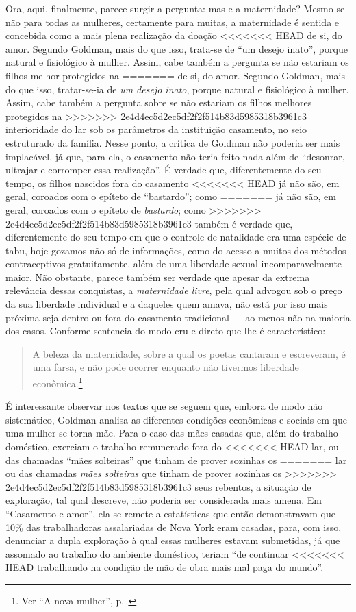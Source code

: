 Ora, aqui, finalmente, parece surgir a pergunta: mas e a maternidade?
Mesmo se não para todas as mulheres, certamente para muitas, a
maternidade é sentida e concebida como a mais plena realização da doação
<<<<<<< HEAD
de si, do amor. Segundo Goldman, mais do que isso, trata-se de ``um
desejo inato'', porque natural e fisiológico à mulher. Assim, cabe
também a pergunta se não estariam os filhos melhor protegidos na
=======
de si, do amor. Segundo Goldman, mais do que isso, tratar-se-ia de \textit{um
desejo inato}, porque natural e fisiológico à mulher. Assim, cabe
também a pergunta sobre se não estariam os filhos melhores protegidos na
>>>>>>> 2e4d4ec5d2ec5df2f2f514b83d5985318b3961c3
interioridade do lar sob os parâmetros da instituição casamento, no seio
estruturado da família. Nesse ponto, a crítica de Goldman não poderia
ser mais implacável, já que, para ela, o casamento não teria feito nada
além de ``desonrar, ultrajar e corromper essa realização''. É verdade
que, diferentemente do seu tempo, os filhos nascidos fora do casamento
<<<<<<< HEAD
já não são, em geral, coroados com o epíteto de ``bastardo''; como
=======
já não são, em geral, coroados com o epíteto de \textit{bastardo}; como
>>>>>>> 2e4d4ec5d2ec5df2f2f514b83d5985318b3961c3
também é verdade que, diferentemente do seu tempo em que o controle de
natalidade era uma espécie de tabu, hoje gozamos não só de informações,
como do acesso a muitos dos métodos contraceptivos gratuitamente, além
de uma liberdade sexual incomparavelmente maior. Não obstante, parece
também ser verdade que apesar da extrema relevância dessas conquistas, a
\textit{maternidade livre}, pela qual advogou sob o preço da sua liberdade
individual e a daqueles quem amava, não está por isso mais próxima seja
dentro ou fora do casamento tradicional --- ao menos não na maioria dos
casos. Conforme sentencia do modo cru e direto que lhe é característico:

\begin{quote}
A beleza da maternidade, sobre a qual os poetas cantaram
e escreveram, é uma farsa, e não pode ocorrer enquanto não tivermos
liberdade econômica.\footnote{Ver ``A nova mulher'', p.\,\pageref{maternidade}.}
\end{quote}

É interessante observar nos textos que se seguem que, embora de modo não
sistemático, Goldman analisa as diferentes condições econômicas e
sociais em que uma mulher se torna mãe. Para o caso das mães casadas
que, além do trabalho doméstico, exerciam o trabalho remunerado fora do
<<<<<<< HEAD
lar, ou das chamadas ``mães solteiras'' que tinham de prover sozinhas os
=======
lar ou das chamadas \textit{mães solteiras} que tinham de prover sozinhas os
>>>>>>> 2e4d4ec5d2ec5df2f2f514b83d5985318b3961c3
seus rebentos, a situação de exploração, tal qual descreve, não poderia
ser considerada mais amena. Em ``Casamento e amor'', ela se remete a
estatísticas que então demonstravam que 10\% das trabalhadoras
assalariadas de Nova York eram casadas, para, com isso, denunciar a
dupla exploração à qual essas mulheres estavam submetidas, já que
assomado ao trabalho do ambiente doméstico, teriam ``de continuar
<<<<<<< HEAD
trabalhando na condição de mão de obra mais mal paga do mundo''.


